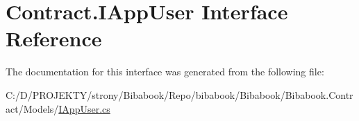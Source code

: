 \hypertarget{interface_contract_1_1_i_app_user}{}\section{Contract.\+I\+App\+User Interface Reference}
\label{interface_contract_1_1_i_app_user}


The documentation for this interface was generated from the following file\+:\begin{DoxyCompactItemize}
\item 
C\+:/\+D/\+P\+R\+O\+J\+E\+K\+T\+Y/strony/\+Bibabook/\+Repo/bibabook/\+Bibabook/\+Bibabook.\+Contract/\+Models/\hyperlink{_i_app_user_8cs}{I\+App\+User.\+cs}\end{DoxyCompactItemize}

